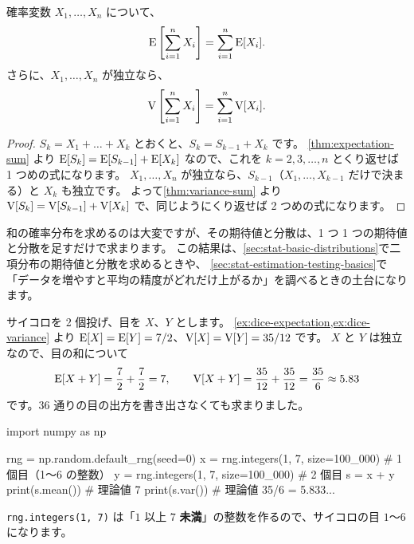 \begin{corollary}
  確率変数 $X_1, \dots, X_n$ について、
  \[
    \mathrm{E}\left[\sum_{i=1}^{n} X_i\right] = \sum_{i=1}^{n} \mathrm{E}[X_i].
  \]
  さらに、$X_1, \dots, X_n$ が独立なら、
  \[
    \mathrm{V}\left[\sum_{i=1}^{n} X_i\right] = \sum_{i=1}^{n} \mathrm{V}[X_i].
  \]
\end{corollary}

\begin{proof}
  $S_{k} = X_1 + \dots + X_{k}$ とおくと、$S_{k} = S_{k-1} + X_{k}$ です。
  \cref{thm:expectation-sum} より $\mathrm{E}[S_k] = \mathrm{E}[S_{k-1}] + \mathrm{E}[X_k]$ なので、これを $k = 2, 3, \dots, n$ とくり返せば 1 つめの式になります。
  $X_1, \dots, X_n$ が独立なら、$S_{k-1}$（$X_1, \dots, X_{k-1}$ だけで決まる）と $X_k$ も独立です。
  よって\cref{thm:variance-sum} より $\mathrm{V}[S_k] = \mathrm{V}[S_{k-1}] + \mathrm{V}[X_k]$ で、同じようにくり返せば 2 つめの式になります。
\end{proof}

\begin{merit}
  和の確率分布を求めるのは大変ですが、その期待値と分散は、1 つ 1 つの期待値と分散を足すだけで求まります。
  この結果は、\cref{sec:stat-basic-distributions}で二項分布の期待値と分散を求めるときや、
  \cref{sec:stat-estimation-testing-basics}で「データを増やすと平均の精度がどれだけ上がるか」を調べるときの土台になります。
\end{merit}

\begin{example}
  サイコロを 2 個投げ、目を $X$、$Y$ とします。
  \cref{ex:dice-expectation,ex:dice-variance} より $\mathrm{E}[X] = \mathrm{E}[Y] = 7/2$、$\mathrm{V}[X] = \mathrm{V}[Y] = 35/12$ です。
  $X$ と $Y$ は独立なので、目の和について
  \[
    \mathrm{E}[X + Y] = \frac72 + \frac72 = 7, \qquad \mathrm{V}[X + Y] = \frac{35}{12} + \frac{35}{12} = \frac{35}{6} \approx 5.83
  \]
  です。36 通りの目の出方を書き出さなくても求まりました。
\end{example}

\begin{pycode}
import numpy as np

rng = np.random.default_rng(seed=0)
x = rng.integers(1, 7, size=100_000)   # 1 個目（1〜6 の整数）
y = rng.integers(1, 7, size=100_000)   # 2 個目
s = x + y
print(s.mean())   # 理論値 7
print(s.var())    # 理論値 35/6 = 5.833...
\end{pycode}

\texttt{rng.integers(1, 7)} は「$1$ 以上 $7$ \textbf{未満}」の整数を作るので、サイコロの目 $1$〜$6$ になります。

